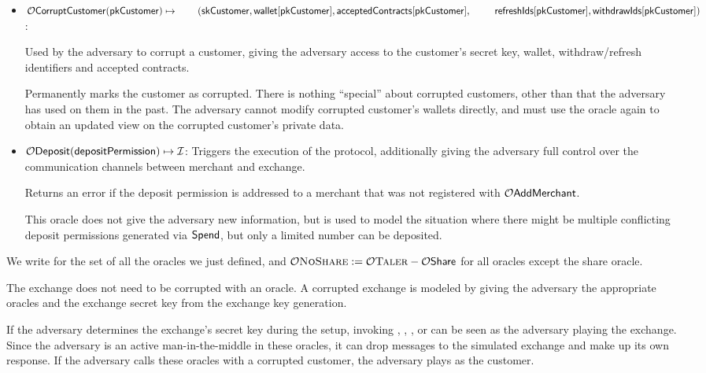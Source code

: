 \begin{itemize}

  \item $\ora{CorruptCustomer}(\V{pkCustomer})\mapsto
    \newline{}\qquad (\V{skCustomer}, \V{wallet}[\V{pkCustomer}],\V{acceptedContracts}[\V{pkCustomer}], 
    \newline{}\qquad \phantom{(}\V{refreshIds}[\V{pkCustomer}], \V{withdrawIds}[\V{pkCustomer}])$:

    Used by the adversary to corrupt a customer, giving the adversary access to
    the customer's secret key, wallet, withdraw/refresh identifiers and accepted contracts.

    Permanently marks the customer as corrupted.  There is nothing ``special''
    about corrupted customers, other than that the adversary has used
     on them in the past.  The adversary cannot modify
    corrupted customer's wallets directly, and must use the oracle again to
    obtain an updated view on the corrupted customer's private data.

  \item $\mathcal{O}\mathsf{Deposit}(\mathsf{depositPermission}) \mapsto \mathcal{I}$:
    Triggers the execution of the  protocol, additionally giving
    the adversary full control over the communication channels between merchant and exchange.

    Returns an error if the deposit permission is addressed to a merchant that was not registered
    with $\mathcal{O}\mathsf{AddMerchant}$.
    
    This oracle does not give the adversary new information, but is used to
    model the situation where there might be multiple conflicting deposit
    permissions generated via $\mathsf{Spend}$, but only a limited number can be
    deposited.
\end{itemize}

We write  for the set of all the oracles we just defined,
and $\mathcal{O}\textsc{NoShare} := \mathcal{O}\textsc{Taler} - \mathcal{O}\mathsf{Share}$ for all oracles except
the share oracle.

The exchange does not need to be corrupted with an oracle. A corrupted exchange
is modeled by giving the adversary the appropriate oracles and the exchange
secret key from the exchange key generation.

If the adversary determines the exchange's secret key during the setup,
invoking , , ,
 or  can be seen as the adversary playing the
exchange.  Since the adversary is an active man-in-the-middle in these oracles,
it can drop messages to the simulated exchange and make up its own response.
If the adversary calls these oracles with a corrupted customer, the adversary
plays as the customer.

